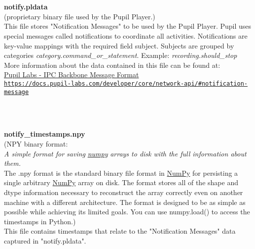 \begin{description}
\begin{addmargin}[0em]{0em}
    \textbf{\\\\}
    \begin{addmargin}[1em]{0em} %
        \label{notify.pldata}
        \textbf{notify.pldata}\\(proprietary binary file used by the Pupil Player.)\\
        This file stores "Notification Messages" to be used by the Pupil Player.
        Pupil uses special messages called notifications to coordinate all activities.
        Notifications are key-value mappings with the required field subject.
        Subjects are grouped by categories \textit{category.command\_or\_statement}.
        Example: \textit{recording.should\_stop}\\
        More information about the data contained in this file can be found at:\\
        \href{https://docs.pupil-labs.com/developer/core/network-api/#notification-message}
        {{Pupil Labs - IPC Backbone Message Format}\\\nolinkurl{https://docs.pupil-labs.com/developer/core/network-api/\#notification-message}}
    \end{addmargin} %

    \textbf{\\\\}
    \begin{addmargin}[1em]{0em} %
        \label{notify_timestamps.npy}
        \textbf{notify\_timestamps.npy}\\
        (NPY binary format:\\
        \textit{A simple format for saving}
        \href{https://numpy.org/doc/stable/reference/generated/numpy.lib.format.html#module-numpy.lib.format}{\textit{numpy}}
        \textit{arrays to disk with the full information about them.}\\
        The .npy format is the standard binary file format in 
        \href{https://numpy.org/doc/stable/reference/generated/numpy.lib.format.html#module-numpy.lib.format}{NumPy}
        for persisting a single arbitrary
        \href{https://numpy.org/doc/stable/reference/generated/numpy.lib.format.html#module-numpy.lib.format}{NumPy}
        array on disk. The format stores all of the shape and dtype information necessary to
        reconstruct the array correctly even on another machine with a different architecture.
        The format is designed to be as simple as possible while achieving its limited goals.
        You can use numpy.load() to access the timestamps in Python.)\\
        This file contains timestamps that relate to the "Notification Messages" data captured in "notify.pldata". 
    \end{addmargin} %


\end{addmargin}
\end{description}
